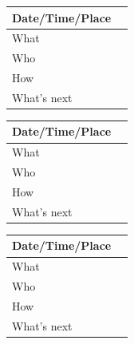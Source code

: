 \documentclass{article}
\begin{document}
\begin{table}[H]
\begin{tabular}{|p{1.5in}|p{4in}|}
\hline
Date/Time/Place &  \\ \hline
What            &  \\ \hline
Who             &  \\ \hline
How             &  \\ \hline
What's next     &  \\ \hline
\end{tabular}
\end{table}

\begin{table}[H]
\begin{tabular}{|p{1.5in}|p{4in}|}
\hline
Date/Time/Place &  \\ \hline
What            &  \\ \hline
Who             &  \\ \hline
How             &  \\ \hline
What's next     &  \\ \hline
\end{tabular}
\end{table}

\begin{table}[H]
\begin{tabular}{|p{1.5in}|p{4in}|}
\hline
Date/Time/Place &  \\ \hline
What            &  \\ \hline
Who             &  \\ \hline
How             &  \\ \hline
What's next     &  \\ \hline
\end{tabular}
\end{table}
\end{document}
